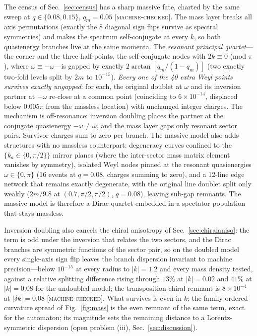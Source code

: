 \documentclass[aps,prd,twocolumn,superscriptaddress,nofootinbib,floatfix]{revtex4-2}
\newcommand{\evM}{\textnormal{\textsc{[machine-checked]}}}
\begin{document}
The census of Sec.~\ref{sec:census} has a sharp massive fate, charted
by the same sweep at $q\in\{0.08,0.15\}$, $q_m=0.05$ \evM{}. The mass
layer breaks all axis permutations (exactly the 8 diagonal sign flips
survive as spectral symmetries) and makes the spectrum self-conjugate
at every $k$, so both quasienergy branches live at the same momenta.
The \emph{resonant principal quartet}---the corner and the three
half-points, the self-conjugate nodes with $2k\equiv0$ (mod $\pi$),
where $\omega\equiv-\omega$---is gapped by exactly
$2\arctan[q_m/(1-q_m)]$ (two exactly two-fold levels split by $2m$ to
$10^{-15}$). \emph{Every one of the 40 extra Weyl points survives
exactly ungapped}: for each, the original doublet at $\omega$ and its
inversion partner at $-\omega$ re-close at a common point (coinciding
to $6\times10^{-14}$, displaced below $0.005\pi$ from the massless
location) with unchanged integer charges. The mechanism is
off-resonance: inversion doubling places the partner at the conjugate
quasienergy $-\omega\neq\omega$, and the mass layer gaps only resonant
sector pairs. Survivor charges sum to zero per branch. The massive
model also adds structures with no massless counterpart: degeneracy
curves confined to the $\{k_a\in\{0,\pi/2\}\}$ mirror planes (where the
inter-sector mass matrix element vanishes by symmetry), isolated Weyl
nodes pinned at the resonant quasienergies $\omega\in\{0,\pi\}$ (16
events at $q=0.08$, charges summing to zero), and a 12-line edge
network that remains exactly degenerate, with the original line
doublet split only weakly ($2m/9.8$ at $(0.7,\pi/2,\pi/2)$, $q=0.08$),
leaving sub-gap remnants. The massive model is therefore a Dirac
quartet embedded in a spectator population that stays massless.

Inversion doubling also cancels the chiral anisotropy of
Sec.~\ref{sec:chiralaniso}: the term is odd under the
inversion that relates the two sectors, and the Dirac branches are
symmetric functions of the sector pair, so on the doubled model every
single-axis sign flip leaves the branch dispersion invariant to
machine precision---below $10^{-15}$ at every radius to $|k|=1.2$ and
every mass density tested, against a relative splitting difference
rising through $13\%$ at $|k|=0.02$ and $41\%$ at $|k|=0.08$ for the
undoubled model; the transposition-chiral remnant is
$8\times10^{-4}$ at $|\delta k|=0.08$ \evM{}. What survives is even in
$k$: the family-ordered curvature spread of
Fig.~\ref{fig:mass} is the even remnant of the same term, exact for
the automaton; its magnitude sets the remaining distance to a
Lorentz-symmetric dispersion (open problem (iii),
Sec.~\ref{sec:discussion}).
\end{document}
